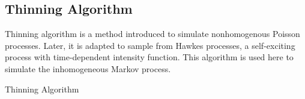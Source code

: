 \subsection{Thinning Algorithm}
Thinning algorithm is a method introduced to simulate nonhomogenous Poisson processes. \cite{Lewis1979} Later, it is adapted to sample from Hawkes processes, a self-exciting process with time-dependent intensity function. \cite{Ogaata1981, Rizoiu2017} This algorithm is used here to simulate the inhomogeneous Markov process.

\begin{algorithm}[H]
	
	
	\begin{algorithmic}[1]
		\ENDIF
		\ENDWHILE
	\end{algorithmic}
	\caption{Thinning Algorithm}
\end{algorithm}
